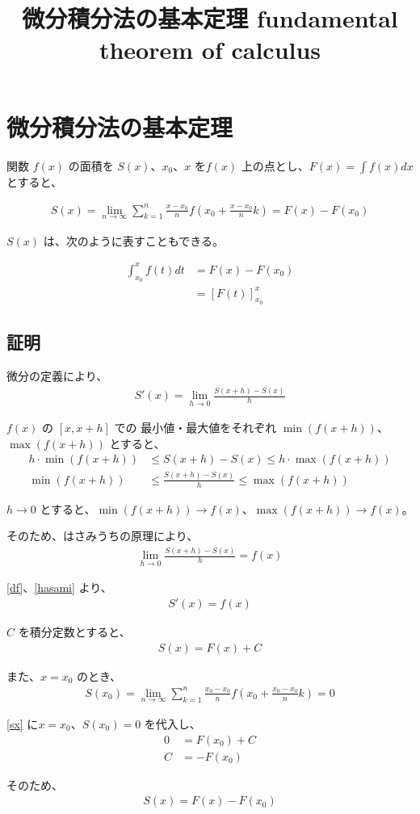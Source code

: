 \documentclass[fleqn]{jsarticle}
\begin{document}
\title{微分積分法の基本定理 fundamental theorem of calculus}
\author{}
\date{}

\section*{微分積分法の基本定理}

関数 $f(x)$ の面積を $S(x)$、$x_0$、$x$ を$f(x)$ 上の点とし、$F(x) = \int f(x) dx$ とすると、

\begin{align*}
  S(x) = \lim_{n \to \infty} \sum^{n}_{k=1} \frac{x - x_0}{n} f(x_0 + \frac{x-x_0}{n} k) = F(x) - F(x_0)
\end{align*}

$S(x)$ は、次のように表すこともできる。

\begin{align*}
  \int^{x}_{x_0} f(t) dt &= F(x) - F(x_0) \\
  &= [F(t)]^x_{x_0}
\end{align*}

\subsection*{証明}
微分の定義により、
\begin{align}
  S'(x) = \lim_{h \to 0} \frac{S(x+h) - S(x)}{h}
  \label{df}
\end{align}

$f(x)$ の $[x, x+h]$ での 最小値・最大値をそれぞれ $\min(f(x+h))$、$\max(f(x+h))$ とすると、
\begin{align*}
  h \cdot \min(f(x+h)) &\leq S(x+h) - S(x) \leq h \cdot \max(f(x+h)) \\
  \min(f(x+h)) &\leq \frac{S(x+h) - S(x)}{h} \leq \max(f(x+h))
\end{align*}

$h \to 0$ とすると、$\min(f(x+h)) \to f(x)$、$\max(f(x+h)) \to f(x)$。

そのため、はさみうちの原理により、
\begin{align}
  \lim_{h \to 0} \frac{S(x+h) - S(x)}{h} = f(x)
  \label{hasami}
\end{align}


\ref{df}、\ref{hasami} より、
\begin{align*}
  S'(x) = f(x)
\end{align*}

$C$ を積分定数とすると、
\begin{align}
  S(x) = F(x) + C
  \label{sx}
\end{align}

また、$x = x_0$ のとき、
\begin{align*}
  S(x_0) = \lim_{n \to \infty} \sum^{n}_{k=1} \frac{x_0 - x_0}{n} f(x_0 + \frac{x_0-x_0}{n} k) = 0
\end{align*}

\ref{sx} に$x = x_0$、$S(x_0) = 0$ を代入し、
\begin{align*}
  0 &= F(x_0) + C \\
  C &= -F(x_0)
\end{align*}

そのため、
\begin{align*}
  S(x) = F(x) - F(x_0)
\end{align*}
\end{document}
